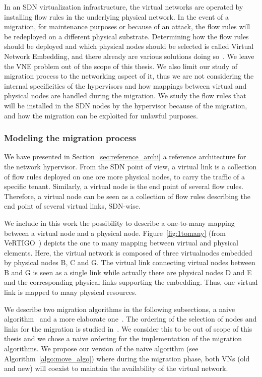 \label{sec:migration}
In an SDN virtualization infrastructure, the virtual networks are operated by installing flow rules in the underlying physical network.
In the event of a migration, for maintenance purposes or because of an attack, the flow rules will be redeployed on a different physical substrate.
Determining how the flow rules should be deployed and which physical nodes should be selected is called Virtual Network Embedding, and there already are various solutions doing so~\cite{Zangiabady2017e, Papagianni2013, Chowdhury2016d, Wang2015}.
We leave the VNE problem out of the scope of this thesis.
We also limit our study of migration process to the networking aspect of it, thus we are not considering the internal specificities of the hypervisors and how mappings between virtual and physical nodes are handled during the migration.
We study the flow rules that will be installed in the SDN nodes by the hypervisor because of the migration, and how the migration can be exploited for unlawful purposes.


\subsubsection{Modeling the migration process}
We have presented in Section~\ref{sec:reference_archi} a reference architecture for the network hypervisor.
From the SDN point of view, a virtual link is a collection of flow rules deployed on one ore more physical nodes, to carry the traffic of a specific tenant.
Similarly, a virtual node is the end point of several flow rules.
Therefore, a virtual node can be seen as a collection of flow rules describing the end point of several virtual links, SDN-wise.

We include in this work the possibility to describe a one-to-many mapping between a virtual node and a physical node.
Figure~\ref{fig:1tomany} (from VeRTIGO~\cite{VeRTIGO-Corin2012a}) depicts the one to many mapping between virtual and physical elements. Here, the virtual network is composed of three virtualnodes embedded by physical nodes B, C and G.
The virtual link connecting virtual nodes between B and G is seen as a single link while actually there are physical nodes D and E and the corresponding physical links supporting the embedding.
Thus, one virtual link is mapped to many physical resources.

We describe two migration algorithms in the following subsections, a naive algorithm~\cite{Lime-Ghorbani2014} and a more elaborate one~\cite{vnm-lo2013}. 
The ordering of the selection of nodes and links for the migration is studied in~\cite{vnm-lo2013}. 
We consider this to be out of scope of this thesis and we chose a naive ordering for the implementation of the migration algorithms.
We propose our version of the naive algorithm (see Algorithm~\ref{algo:move_algo}) where during the migration phase, both VNs (old and new) will coexist to maintain the availability of the virtual network.


